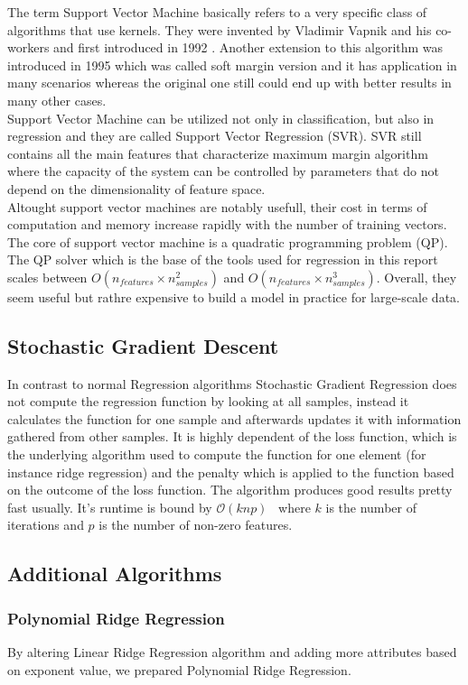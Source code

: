 The term Support Vector Machine basically refers to a very specific class of
algorithms that use kernels. They were invented by Vladimir Vapnik and his
co-workers and first introduced in 1992 \cite{svmorg}. Another extension to this
algorithm was introduced in 1995 which was called soft margin version and it has
 application in many scenarios whereas the original one still could end up
 with better results in many other cases.\\
Support Vector Machine can be utilized not only in classification, but also in
regression and they are called Support Vector Regression (SVR). SVR still
contains all the main features that characterize maximum margin algorithm where
the capacity of the system can be controlled by parameters that do not depend on
the dimensionality of feature space.\\
Altought support vector machines are notably usefull, their cost in terms of
computation and memory increase rapidly with the number of training vectors. The
core of support vector machine is a quadratic programming problem (QP). The QP
solver \cite{alg:svm} which is the base of the tools used for regression in this
report scales between $O(n_{features} \times n_{samples}^2)$ and $O(n_{features} \times
n_{samples}^3)$. Overall, they seem useful but rathre expensive to build a model
in practice for large-scale data.
\subsection{Stochastic Gradient Descent}
In contrast to normal Regression algorithms Stochastic Gradient Regression does not compute the regression function by looking at all samples, instead it calculates the function for one sample and afterwards updates it with information gathered from other samples. It is highly dependent of the loss function, which is the underlying algorithm used to compute the function for one element (for instance ridge regression) and the penalty which is applied to the function based on the outcome of the loss function. The algorithm produces good results pretty fast usually. It's runtime is bound by $\mathcal{O}(knp)$~\cite{alg:sgd} where $k$ is the number of iterations and $p$ is the number of non-zero features. 
\subsection{Additional Algorithms}
\subsubsection{Polynomial Ridge Regression}
By altering Linear Ridge Regression algorithm and adding more attributes based on exponent value, we prepared Polynomial Ridge Regression.

